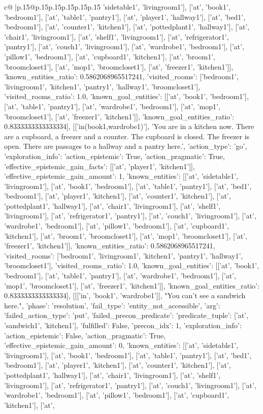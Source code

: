 \documentclass{article}
\begin{document}
{\begin{supertabular}{c@{$\;$}|p{.15\linewidth}@{}p{.15\linewidth}p{.15\linewidth}p{.15\linewidth}p{.15\linewidth}p{.15\linewidth}}
{{{'sidetable1', 'livingroom1'], ['at', 'book1', 'bedroom1'], ['at', 'table1', 'pantry1'], ['at', 'player1', 'hallway1'], ['at', 'bed1', 'bedroom1'], ['at', 'counter1', 'kitchen1'], ['at', 'pottedplant1', 'hallway1'], ['at', 'chair1', 'livingroom1'], ['at', 'shelf1', 'livingroom1'], ['at', 'refrigerator1', 'pantry1'], ['at', 'couch1', 'livingroom1'], ['at', 'wardrobe1', 'bedroom1'], ['at', 'pillow1', 'bedroom1'], ['at', 'cupboard1', 'kitchen1'], ['at', 'broom1', 'broomcloset1'], ['at', 'mop1', 'broomcloset1'], ['at', 'freezer1', 'kitchen1']], 'known_entities_ratio': 0.5862068965517241, 'visited_rooms': ['bedroom1', 'livingroom1', 'kitchen1', 'pantry1', 'hallway1', 'broomcloset1'], 'visited_rooms_ratio': 1.0, 'known_goal_entities': [['at', 'book1', 'bedroom1'], ['at', 'table1', 'pantry1'], ['at', 'wardrobe1', 'bedroom1'], ['at', 'mop1', 'broomcloset1'], ['at', 'freezer1', 'kitchen1']], 'known_goal_entities_ratio': 0.8333333333333334}}], [['in(book1,wardrobe1)'], 'You are in a kitchen now. There are a cupboard, a freezer and a counter. The cupboard is closed. The freezer is open. There are passages to a hallway and a pantry here.', {'action_type': 'go', 'exploration_info': {'action_epistemic': True, 'action_pragmatic': True, 'effective_epistemic_gain_facts': [['at', 'player1', 'kitchen1']], 'effective_epistemic_gain_amount': 1, 'known_entities': [['at', 'sidetable1', 'livingroom1'], ['at', 'book1', 'bedroom1'], ['at', 'table1', 'pantry1'], ['at', 'bed1', 'bedroom1'], ['at', 'player1', 'kitchen1'], ['at', 'counter1', 'kitchen1'], ['at', 'pottedplant1', 'hallway1'], ['at', 'chair1', 'livingroom1'], ['at', 'shelf1', 'livingroom1'], ['at', 'refrigerator1', 'pantry1'], ['at', 'couch1', 'livingroom1'], ['at', 'wardrobe1', 'bedroom1'], ['at', 'pillow1', 'bedroom1'], ['at', 'cupboard1', 'kitchen1'], ['at', 'broom1', 'broomcloset1'], ['at', 'mop1', 'broomcloset1'], ['at', 'freezer1', 'kitchen1']], 'known_entities_ratio': 0.5862068965517241, 'visited_rooms': ['bedroom1', 'livingroom1', 'kitchen1', 'pantry1', 'hallway1', 'broomcloset1'], 'visited_rooms_ratio': 1.0, 'known_goal_entities': [['at', 'book1', 'bedroom1'], ['at', 'table1', 'pantry1'], ['at', 'wardrobe1', 'bedroom1'], ['at', 'mop1', 'broomcloset1'], ['at', 'freezer1', 'kitchen1']], 'known_goal_entities_ratio': 0.8333333333333334}}], [[['in', 'book1', 'wardrobe1']], "You can't see a sandwich here.", {'phase': 'resolution', 'fail_type': 'entity_not_accessible', 'arg': {'failed_action_type': 'put', 'failed_precon_predicate': {'predicate_tuple': ['at', 'sandwich1', 'kitchen1'], 'fulfilled': False, 'precon_idx': 1}}, 'exploration_info': {'action_epistemic': False, 'action_pragmatic': True, 'effective_epistemic_gain_amount': 0, 'known_entities': [['at', 'sidetable1', 'livingroom1'], ['at', 'book1', 'bedroom1'], ['at', 'table1', 'pantry1'], ['at', 'bed1', 'bedroom1'], ['at', 'player1', 'kitchen1'], ['at', 'counter1', 'kitchen1'], ['at', 'pottedplant1', 'hallway1'], ['at', 'chair1', 'livingroom1'], ['at', 'shelf1', 'livingroom1'], ['at', 'refrigerator1', 'pantry1'], ['at', 'couch1', 'livingroom1'], ['at', 'wardrobe1', 'bedroom1'], ['at', 'pillow1', 'bedroom1'], ['at', 'cupboard1', 'kitchen1'], ['at', }}}
\end{supertabular}}
\end{document}
